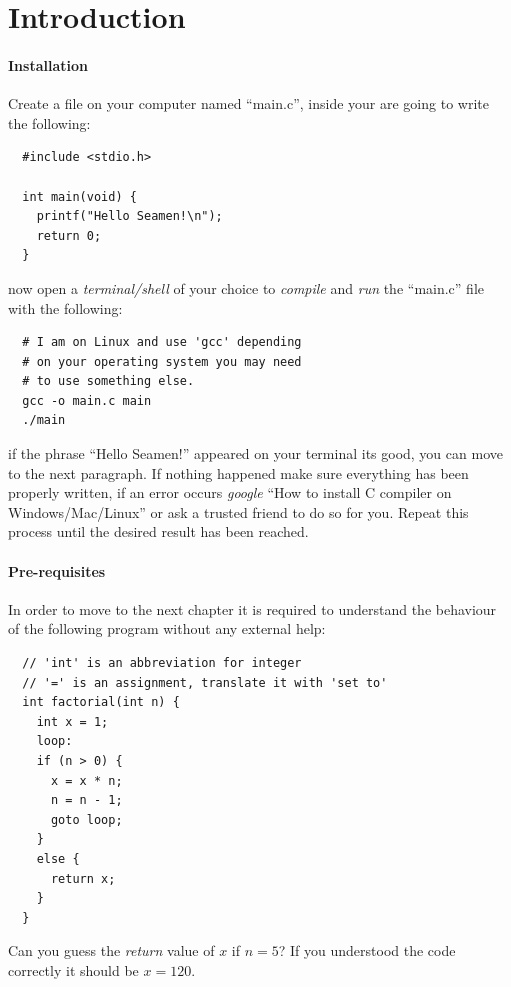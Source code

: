 \section{Introduction}
\paragraph{Installation}
Create a file on your computer named ``main.c'',
inside your are going to write the following:
\begin{verbatim}
  #include <stdio.h>

  int main(void) {
    printf("Hello Seamen!\n");
    return 0;
  }
\end{verbatim}
now open a \textit{terminal/shell} of your choice
to \textit{compile} and \textit{run} the ``main.c''
file with the following:
\begin{verbatim}
  # I am on Linux and use 'gcc' depending
  # on your operating system you may need
  # to use something else.
  gcc -o main.c main
  ./main
\end{verbatim}
if the phrase ``Hello Seamen!'' appeared on your
terminal its good, you can move to the next paragraph.
If nothing happened make sure everything has been properly
written, if an error occurs \textit{google} ``How to install
C compiler on Windows/Mac/Linux'' or ask a trusted friend to
do so for you. Repeat this process until the
desired result has been reached.

\paragraph{Pre-requisites}
In order to move to the next chapter it is required
to understand the behaviour of the following program
without any external help:
\begin{verbatim}
  // 'int' is an abbreviation for integer
  // '=' is an assignment, translate it with 'set to'
  int factorial(int n) {
    int x = 1;
    loop:
    if (n > 0) {
      x = x * n;
      n = n - 1;
      goto loop;
    }
    else {
      return x;
    }
  }
\end{verbatim}
Can you guess the \textit{return} value of $x$ if $n = 5$?
If you understood the code correctly it should be $x = 120$.
